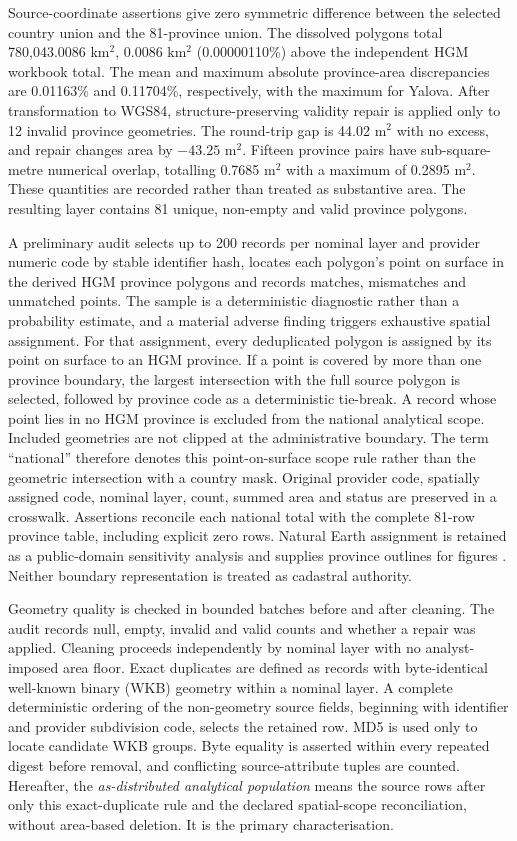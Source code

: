 \documentclass[pdflatex,sn-basic]{sn-jnl}
\begin{document}
Source-coordinate assertions give zero symmetric difference between the selected country union and the 81-province union. The dissolved polygons total 780,043.0086 km$^{2}$, 0.0086 km$^{2}$ (0.00000110\%) above the independent HGM workbook total. The mean and maximum absolute province-area discrepancies are 0.01163\% and 0.11704\%, respectively, with the maximum for Yalova. After transformation to WGS84, structure-preserving validity repair is applied only to 12 invalid province geometries. The round-trip gap is 44.02 m$^{2}$ with no excess, and repair changes area by $-43.25$ m$^{2}$. Fifteen province pairs have sub-square-metre numerical overlap, totalling 0.7685 m$^{2}$ with a maximum of 0.2895 m$^{2}$. These quantities are recorded rather than treated as substantive area. The resulting layer contains 81 unique, non-empty and valid province polygons.

A preliminary audit selects up to 200 records per nominal layer and provider numeric code by stable identifier hash, locates each polygon's point on surface in the derived HGM province polygons and records matches, mismatches and unmatched points. The sample is a deterministic diagnostic rather than a probability estimate, and a material adverse finding triggers exhaustive spatial assignment. For that assignment, every deduplicated polygon is assigned by its point on surface to an HGM province. If a point is covered by more than one province boundary, the largest intersection with the full source polygon is selected, followed by province code as a deterministic tie-break. A record whose point lies in no HGM province is excluded from the national analytical scope. Included geometries are not clipped at the administrative boundary. The term ``national'' therefore denotes this point-on-surface scope rule rather than the geometric intersection with a country mask. Original provider code, spatially assigned code, nominal layer, count, summed area and status are preserved in a crosswalk. Assertions reconcile each national total with the complete 81-row province table, including explicit zero rows. Natural Earth assignment is retained as a public-domain sensitivity analysis and supplies province outlines for figures \citep{natural_earth_admin_2022}. Neither boundary representation is treated as cadastral authority.

Geometry quality is checked in bounded batches before and after cleaning. The audit records null, empty, invalid and valid counts and whether a repair was applied. Cleaning proceeds independently by nominal layer with no analyst-imposed area floor. Exact duplicates are defined as records with byte-identical well-known binary (WKB) geometry within a nominal layer. A complete deterministic ordering of the non-geometry source fields, beginning with identifier and provider subdivision code, selects the retained row. MD5 is used only to locate candidate WKB groups. Byte equality is asserted within every repeated digest before removal, and conflicting source-attribute tuples are counted. Hereafter, the \emph{as-distributed analytical population} means the source rows after only this exact-duplicate rule and the declared spatial-scope reconciliation, without area-based deletion. It is the primary characterisation.
\end{document}
